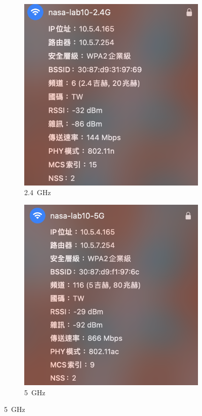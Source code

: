 \documentclass[12pt, a4paper]{article}
\begin{document}
  \begin{figure}[H]
    \begin{subfigure}{0.4\textwidth}
      \includegraphics[width=\textwidth]{2.4G_closest.png}
      \caption{2.4~GHz}
    \end{subfigure}
    \begin{subfigure}{0.4\textwidth}
      \includegraphics[width=\textwidth]{5G_closest.png}
      \caption{5~GHz}
    \end{subfigure}
  \end{figure}
\end{document}
